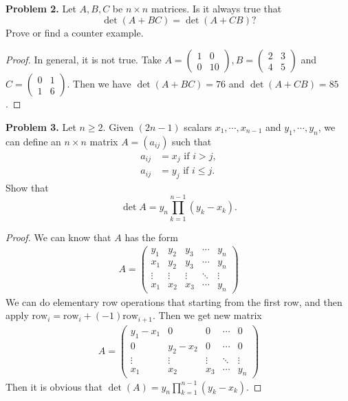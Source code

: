 \documentclass[12pt,leqno]{amsart}
\begin{document}
\medskip

\noindent \textbf{Problem 2.} 
Let $A,B,C$ be $n\times n$ matrices. Is it always true that
$$
\det\left(  A+BC\right)  =\det\left(  A+CB\right)  ?
$$
Prove or find a counter example.
\begin{proof}
In general, it is not true. Take $A = \begin{pmatrix}
    1 & 0 \\
    0 & 10
    \end{pmatrix},
    B = 
    \begin{pmatrix}
    2 & 3 \\
    4 & 5
    \end{pmatrix}$
and $C = \begin{pmatrix}
    0 & 1 \\
    1 & 6
    \end{pmatrix}$.
Then we have $\det(A+BC) = 76$ and $\det(A+CB) = 85$.
\end{proof}

\medskip

\noindent \textbf{Problem 3.} 
Let $n\geq2$. Given $\left(  2n-1\right)  $ scalars $x_{1}%
,\cdots,x_{n-1}$ and $y_{1},\cdots,y_{n}$, we can define an $n\times n$ matrix
$A=\left(  a_{ij}\right)  $ such that%
\begin{align*}
a_{ij} &  =x_{j}\text{ if }i>j,\\
a_{ij} &  =y_{j}\text{ if }i\leq j.
\end{align*}
Show that%
$$
\det A=y_{n}%
{\displaystyle\prod\limits_{k=1}^{n-1}}
\left(  y_{k}-x_{k}\right).
$$
\begin{proof}
We can know that $A$ has the form 
\begin{align*}
    A = \begin{pmatrix}
    y_1 & y_2 & y_3 & \cdots & y_n \\
    x_1 & y_2 & y_3 & \cdots & y_n \\
    \vdots & \vdots & \vdots & \ddots & \vdots \\
    x_1 & x_2 & x_3 & \cdots & y_n
    \end{pmatrix}
\end{align*}
We can do elementary row operations that starting from the first row, and then apply $\text{row}_i=\text{row}_i+(-1)\text{row}_{i+1}$. Then we get new matrix
\begin{align*}
    A = \begin{pmatrix}
    y_1-x_1 & 0 & 0 & \cdots & 0 \\
    0 & y_2-x_2 & 0 & \cdots & 0 \\
    \vdots & \vdots & \vdots & \ddots & \vdots \\
    x_1 & x_2 & x_3 & \cdots & y_n
    \end{pmatrix}
\end{align*}
Then it is obvious that $\det(A)=y_n \prod_{k=1}^{n-1} (y_k-x_k)$.
\end{proof}
\end{document}

